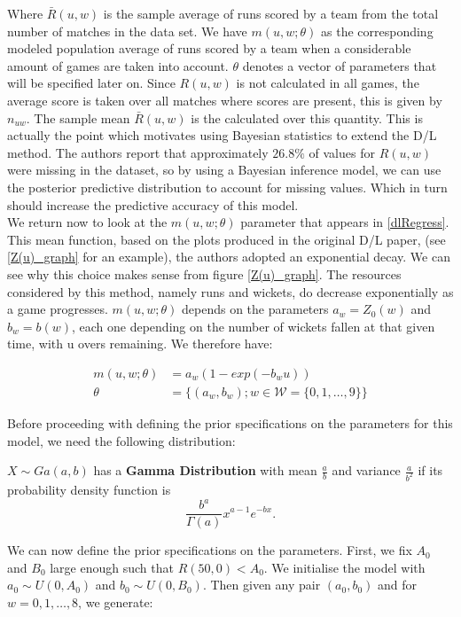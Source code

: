 Where $\bar{R}(u,w)$ is the sample average of runs scored by a team from the total number of matches in the data set. We have $m(u,w;\theta)$
as the corresponding modeled population average of runs scored by a team when a considerable amount of games are taken into account. $\theta$ denotes 
a vector of parameters that will be specified later on. Since $R(u,w)$ is not calculated in all games, the average score is taken over all matches where
scores are present, this is given by $n_{uw}$. The sample mean $\bar{R}(u,w)$ is the calculated over this quantity. This is actually the point which motivates
using Bayesian statistics to extend the D/L method. The authors report that approximately $26.8\%$ of values for $R(u,w)$ were missing in the dataset, so by 
using a Bayesian inference model, we can use the posterior predictive distribution to account for missing values. Which in turn should increase the 
predictive accuracy of this model. \\

We return now to look at the $m(u,w;\theta)$ parameter that appears in \ref{dlRegress}. This mean function, based on the plots produced in the original D/L
paper, (see \ref{Z(u)_graph} for an example), the authors adopted an exponential decay. We can see why this choice makes sense from figure \ref{Z(u)_graph}.
The resources considered by this method, namely runs and wickets, do decrease exponentially as a game progresses. $m(u,w;\theta)$ depends on the parameters
$a_w = Z_0(w)$ and $b_w = b(w)$, each one depending on the number of wickets fallen at that given time, with u overs remaining. We therefore have:

\begin{align}
    \label{mdef}
        m(u,w;\theta) &= a_w(1-exp(-b_wu)) \\
               \theta &= \{ (a_w,b_w); w \in \mathcal{W}=\{0,1,\ldots,9\} \} 
\end{align}

Before proceeding with defining the prior specifications on the parameters for this model, we need the following distribution:

\begin{definition}
    $X \sim Ga(a,b)$ has a \textbf{Gamma Distribution} with mean $\frac{a}{b}$ and variance $\frac{a}{b^2}$ if its probability density function is
    $$
        \frac{b^a}{\Gamma(a)} x^{a-1}e^{-bx}.  
    $$
\end{definition}

We can now define the prior specifications on the parameters. First, we fix $A_0$ and $B_0$ large enough such that $R(50,0) < A_0$. We initialise  the model with
$a_0 \sim U(0,A_0)$ and $b_0 \sim U(0,B_0)$. Then given any pair $(a_0,b_0)$ and for $w=0,1,\ldots,8$, we generate:

